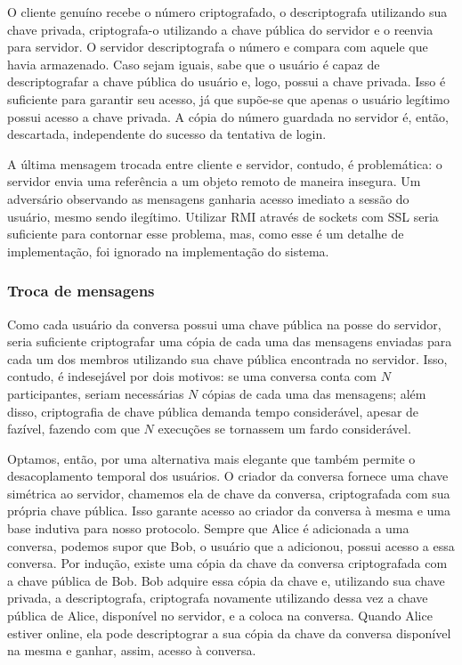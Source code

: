 \documentclass[../main.tex]{subfiles}
\begin{document}
O cliente genuíno recebe o número criptografado, o descriptografa utilizando sua chave privada, criptografa-o utilizando a chave pública do servidor e o reenvia para servidor.
O servidor descriptografa o número e compara com aquele que havia armazenado.
Caso sejam iguais, sabe que o usuário é capaz de descriptografar a chave pública do usuário e, logo, possui a chave privada.
Isso é suficiente para garantir seu acesso, já que supõe-se que apenas o usuário legítimo possui acesso a chave privada.
A cópia do número guardada no servidor é, então, descartada, independente do sucesso da tentativa de login.

A última mensagem trocada entre cliente e servidor, contudo, é problemática: o servidor envia uma referência a um objeto remoto de maneira insegura.
Um adversário observando as mensagens ganharia acesso imediato a sessão do usuário, mesmo sendo ilegítimo.
Utilizar RMI através de sockets com SSL seria suficiente para contornar esse problema, mas, como esse é um detalhe de implementação, foi ignorado na implementação do sistema.

\subsubsection{Troca de mensagens}

Como cada usuário da conversa possui uma chave pública na posse do servidor, seria suficiente criptografar uma cópia de cada uma das mensagens enviadas para cada um dos membros utilizando sua chave pública encontrada no servidor.
Isso, contudo, é indesejável por dois motivos: se uma conversa conta com $N$ participantes, seriam necessárias $N$ cópias de cada uma das mensagens; além disso, criptografia de chave pública demanda tempo considerável, apesar de fazível, fazendo com que $N$ execuções se tornassem um fardo considerável.

Optamos, então, por uma alternativa mais elegante que também permite o desacoplamento temporal dos usuários.
O criador da conversa fornece uma chave simétrica ao servidor, chamemos ela de chave da conversa, criptografada com sua própria chave pública.
Isso garante acesso ao criador da conversa à mesma e uma base indutiva para nosso protocolo.
Sempre que Alice é adicionada a uma conversa, podemos supor que Bob, o usuário que a adicionou, possui acesso a essa conversa.
Por indução, existe uma cópia da chave da conversa criptografada com a chave pública de Bob.
Bob adquire essa cópia da chave e, utilizando sua chave privada, a descriptografa, criptografa novamente utilizando dessa vez a chave pública de Alice, disponível no servidor, e a coloca na conversa.
Quando Alice estiver online, ela pode descriptograr a sua cópia da chave da conversa disponível na mesma e ganhar, assim, acesso à conversa.
\end{document}

